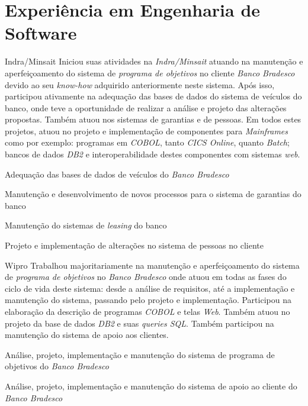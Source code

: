 \section{Experiência em Engenharia de Software}
\begin{experience}{Indra/Minsait}{
}
Iniciou suas atividades na \emph{Indra/Minsait} atuando na manutenção e aperfeiçoamento do
sistema de \emph{programa de objetivos} no cliente \emph{Banco Bradesco} devido ao seu
\emph{know-how} adquirido anteriormente neste sistema. Após isso, participou ativamente na
adequação das bases de dados do sistema de veículos do banco, onde teve a oportunidade de
realizar a análise e projeto das alterações propostas. Também atuou nos sistemas de
garantias e de pessoas. Em todos estes projetos, atuou no projeto e implementação de
componentes para \emph{Mainframes} como por exemplo: programas em \emph{COBOL}, tanto
\emph{CICS Online}, quanto \emph{Batch}; bancos de dados \emph{DB2} e interoperabilidade
destes componentes com sistemas \emph{web}.
\\
\begin{contribs}
	\item{Adequação das bases de dados de veículos do \emph{Banco Bradesco}}
	\item{Manutenção e desenvolvimento de novos processos para o sistema de garantias do banco}
	\item{Manutenção do sistemas de \emph{leasing} do banco}
	\item{Projeto e implementação de alterações no sistema de pessoas no cliente}
\end{contribs}
\end{experience}

\begin{experience}{Wipro}{
}
Trabalhou majoritariamente na manutenção e aperfeiçoamento do sistema de \emph{programa de objetivos}
no \emph{Banco Bradesco} onde atuou em todas as fases do ciclo de vida deste sistema: desde a
análise de requisitos, até a implementação e manutenção do sistema, passando pelo projeto e
implementação. Participou na elaboração da descrição de programas \emph{COBOL} e telas \emph{Web}.
Também atuou no projeto da base de dados \emph{DB2} e suas \emph{queries SQL}. Também participou
na manutenção do sistema de apoio aos clientes.
\\
\begin{contribs}
	\item{Análise, projeto, implementação e manutenção do sistema de programa de objetivos
		do \emph{Banco Bradesco}}
	\item{Análise, projeto, implementação e manutenção do sistema de apoio ao cliente
		do \emph{Banco Bradesco}}
\end{contribs}
\end{experience}

